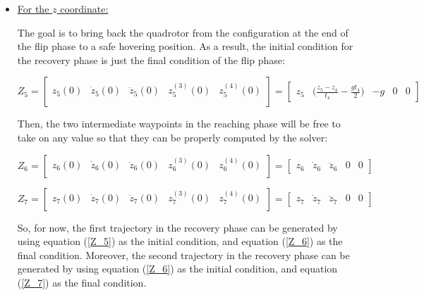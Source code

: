 \documentclass{thesisreport}
\begin{document}
\begin{itemize}
	\item \underline{For the $z$ coordinate:}

The goal is to bring back the quadrotor from the configuration at the end of the flip phase to a safe hovering position. As a result, the initial condition for the recovery phase is just the final condition of the flip phase:

\begin{equation}\label{Z_5}
	Z_5 = \begin{bmatrix}
	z_5(0) & \dot{z}_5 (0) & \ddot{z}_5 (0) & z_5^{(3)} (0) & z_5^{(4)} (0) \\
	\end{bmatrix} = \begin{bmatrix}
	z_5 & \bigg(\frac{z_5 - z_4}{t_4} - \frac{g t_4}{2} \bigg) & -g & 0 & 0
	\end{bmatrix} 
\end{equation}

Then, the two intermediate waypoints in the reaching phase will be free to take on any value so that they can be properly computed by the solver:

\begin{equation}\label{Z_6}
	Z_6 = \begin{bmatrix}
	z_6(0) & \dot{z}_6 (0) & \ddot{z}_6 (0) & z_6^{(3)} (0) & z_6^{(4)} (0) \\
	\end{bmatrix} = \begin{bmatrix}
	z_6 & \dot{z}_6 & \ddot{z}_6 & 0 & 0
	\end{bmatrix} 
\end{equation}

\begin{equation}\label{Z_7}
	Z_7 = \begin{bmatrix}
	z_7(0) & \dot{z}_7 (0) & \ddot{z}_7 (0) & z_7^{(3)} (0) & z_7^{(4)} (0) \\
	\end{bmatrix} = \begin{bmatrix}
	z_7 & \dot{z}_7 & \ddot{z}_7 & 0 & 0
	\end{bmatrix} 
\end{equation}


So, for now, the first trajectory in the recovery phase can be generated by using equation (\ref{Z_5}) as the initial condition, and equation (\ref{Z_6}) as the final condition. Moreover, the second trajectory in the recovery phase can be generated by using equation (\ref{Z_6}) as the initial condition, and equation (\ref{Z_7}) as the final condition.


\end{itemize}
\end{document}
